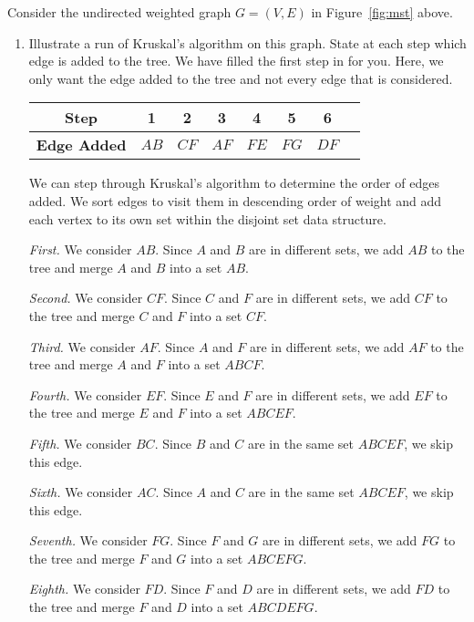 Consider the undirected weighted graph $G = (V, E)$ in Figure~\ref{fig:mst} above.
\begin{enumerate}
    \item  Illustrate a run of Kruskal's algorithm on this graph. State at each step which edge is added to the tree. We have filled the first step in for you. Here, we only want the edge added to the tree and not every edge that is considered. 
    
    \begin{center}
    \begin{tabular}{c|c|c|c|c|c|c|c}
         \textbf{Step} & 1 & 2 & 3 & 4 & 5 & 6\\
         \hline
         \textbf{Edge Added} & $AB$ & $CF$ & $AF$ & $FE$ & $FG$ & $DF$ \\
    \end{tabular}
    \end{center}
\begin{solution}
We can step through Kruskal's algorithm to determine the order of edges added. We sort edges to visit them in descending order of weight and add each vertex to its own set within the disjoint set data structure.

\textit{First. }We consider $AB$. Since $A$ and $B$ are in different sets, we add $AB$ to the tree and merge $A$ and $B$ into a set $AB$.

\textit{Second. }We consider $CF$. Since $C$ and $F$ are in different sets, we add $CF$ to the tree and merge $C$ and $F$ into a set $CF$.

\textit{Third. }We consider $AF$. Since $A$ and $F$ are in different sets, we add $AF$ to the tree and merge $A$ and $F$ into a set $ABCF$.

\textit{Fourth. }We consider $EF$. Since $E$ and $F$ are in different sets, we add $EF$ to the tree and merge $E$ and $F$ into a set $ABCEF$.

\textit{Fifth. }We consider $BC$. Since $B$ and $C$ are in the same set $ABCEF$, we skip this edge.

\textit{Sixth. }We consider $AC$. Since $A$ and $C$ are in the same set $ABCEF$, we skip this edge.

\textit{Seventh. }We consider $FG$. Since $F$ and $G$ are in different sets, we add $FG$ to the tree and merge $F$ and $G$ into a set $ABCEFG$.

\textit{Eighth. }We consider $FD$. Since $F$ and $D$ are in different sets, we add $FD$ to the tree and merge $F$ and $D$ into a set $ABCDEFG$.


\end{solution}
\end{enumerate}
